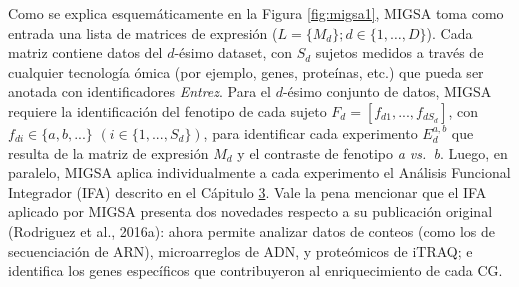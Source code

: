 \documentclass[12pt,twoside]{reedthesis}
\begin{document}
Como se explica esquemáticamente en la Figura \ref{fig:migsa1}, MIGSA toma como entrada una lista de matrices de expresión (\(L=\{M_d\}; d \in \{1,\ldots,D\}\)). Cada matriz contiene datos del \(d\)-ésimo dataset, con \(S_d\) sujetos medidos a través de cualquier tecnología ómica (por ejemplo, genes, proteínas, etc.) que pueda ser anotada con identificadores \emph{Entrez}. Para el \(d\)-ésimo conjunto de datos, MIGSA requiere la identificación del fenotipo de cada sujeto \(F_d=[f_{d1},...,f_{dS_d}]\), con \(f_{di} \in \{a,b,...\}\) \((i\in \{1,...,S_d\})\), para identificar cada experimento \(E_{d}^{a,b}\) que resulta de la matriz de expresión \(M_d\) y el contraste de fenotipo \emph{a vs.~b}. Luego, en paralelo, MIGSA aplica individualmente a cada experimento el Análisis Funcional Integrador (IFA) descrito en el Cápitulo \protect\hyperlink{cap:ifa}{3}. Vale la pena mencionar que el IFA aplicado por MIGSA presenta dos novedades respecto a su publicación original (Rodriguez et al., 2016a): ahora permite analizar datos de conteos (como los de secuenciación de ARN), microarreglos de ADN, y proteómicos de iTRAQ; e identifica los genes específicos que contribuyeron al enriquecimiento de cada CG.
\end{document}
